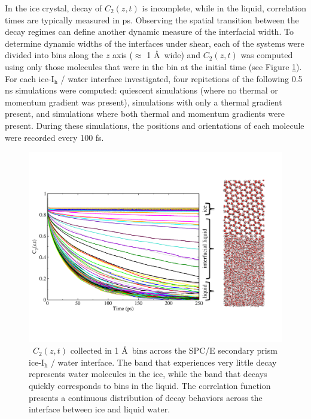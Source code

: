 In the ice crystal, decay of $C_2(z,t)$ is incomplete, while in the
liquid, correlation times are typically measured in ps. Observing the
spatial transition between the decay regimes can define another
dynamic measure of the interfacial width. To determine dynamic widths
of the interfaces under shear, each of the systems were divided into
bins along the $z$ axis ($\approx$ 1 \AA\ wide) and $C_2(z,t)$ was
computed using only those molecules that were in the bin at the
initial time (see Figure \ref{fig:Czt}). For each ice-I$_\mathrm{h}$ /
water interface investigated, four repitetions of the following 0.5 ns
simulations were computed: quiescent simulations (where no thermal or
momentum gradient was present), simulations with only a thermal
gradient present, and simulations where both thermal and momentum
gradients were present. During these simulations, the positions and
orientations of each molecule were recorded every 100 fs.

\begin{figure}
\includegraphics[width=\linewidth]{Figures/CztImage}
\caption{\label{fig:Czt}~$C_2(z,t)$ collected in 1 \AA~bins across the SPC/E
  secondary prism ice-I$_\mathrm{h}$ / water interface. The band that experiences very
  little decay represents water molecules in the ice, while the band
  that decays quickly corresponds to bins in the liquid.  The
  correlation function presents a continuous distribution of decay
  behaviors across the interface between ice and liquid water.}
\end{figure}

